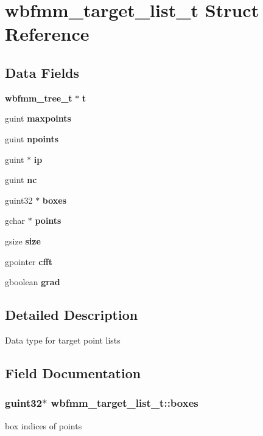 \section{wbfmm\+\_\+target\+\_\+list\+\_\+t Struct Reference}
\label{structwbfmm__target__list__t}
\subsection*{Data Fields}
\begin{DoxyCompactItemize}
\item 
{\bf wbfmm\+\_\+tree\+\_\+t} $\ast$ {\bf t}
\item 
guint {\bf maxpoints}
\item 
guint {\bf npoints}
\item 
guint $\ast$ {\bf ip}
\item 
guint {\bf nc}
\item 
guint32 $\ast$ {\bf boxes}
\item 
gchar $\ast$ {\bf points}
\item 
gsize {\bf size}
\item 
gpointer {\bf cfft}
\item 
gboolean {\bf grad}
\end{DoxyCompactItemize}


\subsection{Detailed Description}
Data type for target point lists 

\subsection{Field Documentation}
\subsubsection[{boxes}]{\setlength{\rightskip}{0pt plus 5cm}guint32$\ast$ wbfmm\+\_\+target\+\_\+list\+\_\+t\+::boxes}\label{structwbfmm__target__list__t_ad41d1c1279c7d7f1eadd3beb086be028}
box indices of points 
